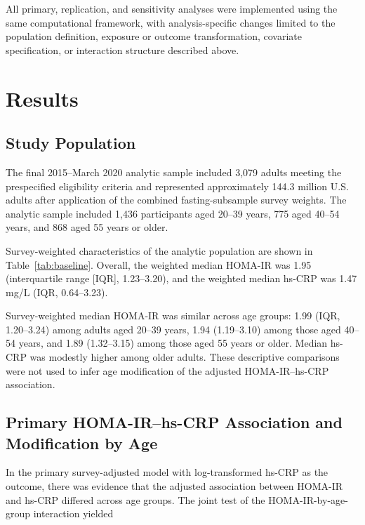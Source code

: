 \documentclass[11pt]{article}
\begin{document}
All primary, replication, and sensitivity analyses were implemented using
the same computational framework, with analysis-specific changes limited
to the population definition, exposure or outcome transformation,
covariate specification, or interaction structure described above.


\section{Results}

\subsection{Study Population}

The final 2015--March 2020 analytic sample included 3,079 adults
meeting the prespecified eligibility criteria and represented
approximately 144.3 million U.S. adults after application of the
combined fasting-subsample survey weights. The analytic sample included
1,436 participants aged 20--39 years, 775 aged 40--54 years, and 868
aged 55 years or older.

Survey-weighted characteristics of the analytic population are shown
in Table~\ref{tab:baseline}. Overall, the weighted median HOMA-IR was
1.95 (interquartile range [IQR], 1.23--3.20), and the weighted median
hs-CRP was 1.47 mg/L (IQR, 0.64--3.23).



Survey-weighted median HOMA-IR was similar across age groups:
1.99 (IQR, 1.20--3.24) among adults aged 20--39 years,
1.94 (1.19--3.10) among those aged 40--54 years, and
1.89 (1.32--3.15) among those aged 55 years or older.
Median hs-CRP was modestly higher among older adults. These
descriptive comparisons were not used to infer age modification
of the adjusted HOMA-IR--hs-CRP association.

\subsection{Primary HOMA-IR--hs-CRP Association and Modification by Age}

In the primary survey-adjusted model with log-transformed hs-CRP as the
outcome, there was evidence that the adjusted association between
HOMA-IR and hs-CRP differed across age groups. The joint test of the
HOMA-IR-by-age-group interaction yielded
\end{document}
